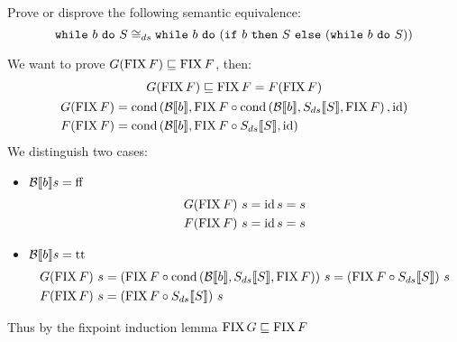 \begin{exercise}{
    Prove or disprove the following semantic equivalence:
    \[ \wwhile{b}{S} \cong_{ds} \wwhile{b}{(\wif{b}{S}{(\wwhile{b}{S})})} \]
}
\begin{itemize}
            We want to prove $G (\FIX F) \sqsubseteq \FIX F$, then:
            \begin{gather*}
                G (\FIX F) \sqsubseteq \FIX F = F(\FIX F) \\
                \begin{aligned}
                    G (\FIX F) &= \cond{\Bool{b}}{\FIX F \circ \cond{\Bool{b}}{\Sds{S}}{\FIX F}}{\id} \\
                    F (\FIX F) &= \cond{\Bool{b}}{\FIX F \circ \Sds{S}}{\id}
                \end{aligned}
            \end{gather*}
            We distinguish two cases:
            \begin{itemize}
                \item $\Bool{b} s = \text{ff}$
                    \begin{align*}
                        G (\FIX F)\ s = \id s = s \\
                        F (\FIX F)\ s = \id s = s
                    \end{align*}
                \item $\Bool{b} s = \text{tt}$
                    \begin{align*}
                        G (\FIX F)\ s &= (\FIX F \circ \cond{\Bool{b}}{\Sds{S}}{\FIX F})\ s = (\FIX F \circ \Sds{S})\ s \\
                        F (\FIX F)\ s &= (\FIX F \circ \Sds{S})\ s
                    \end{align*}
            \end{itemize}
            Thus by the fixpoint induction lemma $\FIX G \sqsubseteq \FIX F$
    \end{itemize}
\end{exercise}

